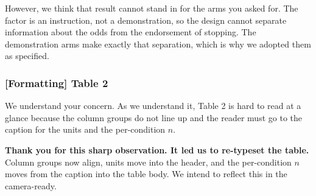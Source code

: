 However, we think that result cannot stand in for the arms you asked for. The factor is an
instruction, not a demonstration, so the design cannot separate information about the odds from
the endorsement of stopping. The demonstration arms make exactly that separation, which is why we
adopted them as specified.

\subsubsection*{\textbf{[Formatting]} Table 2}

We understand your concern. As we understand it, Table 2 is hard to read at a glance because the
column groups do not line up and the reader must go to the caption for the units and the
per-condition $n$.

\textbf{Thank you for this sharp observation. It led us to re-typeset the table.} Column groups
now align, units move into the header, and the per-condition $n$ moves from the caption into the
table body. We intend to reflect this in the camera-ready.
